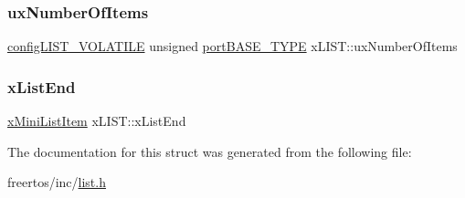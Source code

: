 \subsubsection{\texorpdfstring{ux\+Number\+Of\+Items}{uxNumberOfItems}}
{\footnotesize\ttfamily \mbox{\hyperlink{list_8h_a2d5de557c5561c8980d1bf51d87d8cba}{config\+L\+I\+S\+T\+\_\+\+V\+O\+L\+A\+T\+I\+LE}} unsigned \mbox{\hyperlink{portmacro_8h_a1ebe82d24d764ae4e352f7c3a9f92c01}{port\+B\+A\+S\+E\+\_\+\+T\+Y\+PE}} x\+L\+I\+S\+T\+::ux\+Number\+Of\+Items}

\mbox{\label{structx_l_i_s_t_a919ec0b26ba08c9787675b6161f7e318}} 
\subsubsection{\texorpdfstring{x\+List\+End}{xListEnd}}
{\footnotesize\ttfamily \mbox{\hyperlink{list_8h_a9fb3b8c76f89efd6b8787f66e94ba04c}{x\+Mini\+List\+Item}} x\+L\+I\+S\+T\+::x\+List\+End}



The documentation for this struct was generated from the following file\+:\begin{DoxyCompactItemize}
\item 
freertos/inc/\mbox{\hyperlink{list_8h}{list.\+h}}\end{DoxyCompactItemize}
